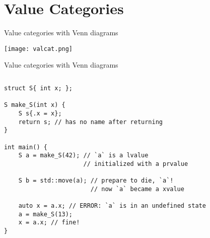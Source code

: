 \begin{frame}
    \centering
    \scalebox{3}{Value Categories}
\end{frame}

\section{Value Categories}

\begin{frame}{Value categories with Venn diagrams}
    \centering

    \texttt{[image: valcat.png]}


\end{frame}

\begin{frame}[fragile]{Value categories with Venn diagrams}
    \begin{center}
    \end{center}
    \begin{columns}
        \begin{column}{.7\textwidth}
            \begin{lstlisting}
struct S{ int x; };

S make_S(int x) {
    S s{.x = x};
    return s; // has no name after returning
}

int main() {
    S a = make_S(42); // `a` is a lvalue
                      // initialized with a prvalue

    S b = std::move(a); // prepare to die, `a`!
                        // now `a` became a xvalue

    auto x = a.x; // ERROR: `a` is in an undefined state
    a = make_S(13);
    x = a.x; // fine!
}
            \end{lstlisting}
        \end{column}
        \begin{column}{.25\textwidth}
        \end{column}
    \end{columns}
\end{frame}

